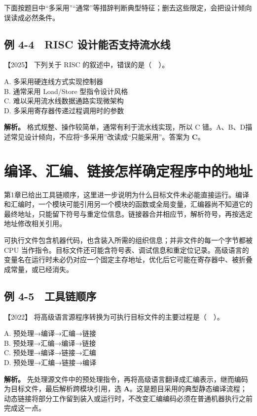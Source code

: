 下面按题目中``多采用''``通常''等措辞判断典型特征；删去这些限定，会把设计倾向误读成必然条件。

\subsection{例 4-4　RISC 设计能否支持流水线}\label{co-ex4-4}

\noindent{}【2025】 下列关于 RISC 的叙述中，错误的是（　）。

A. 多采用硬连线方式实现控制器\\
B. 通常采用 Load/Store 型指令设计风格\\
C. 难以采用流水线数据通路实现微架构\\
D. 多采用寄存器传递过程调用时的参数


\textbf{解析。} 格式规整、操作较简单，通常有利于流水线实现，所以 C 错。A、B、D描述常见设计倾向，不应将``多采用''改读成``只能采用''。答案为 \textbf{C}。

\section{编译、汇编、链接怎样确定程序中的地址}\label{co-04-05}

第1章已给出工具链顺序，这里进一步说明为什么目标文件未必能直接运行。编译和汇编时，一个模块可能引用另一个模块的函数或全局变量，汇编器尚不知道它的最终地址，只能留下符号与重定位信息。链接器合并相应节，解析符号，再按选定地址修改相关引用。

可执行文件包含机器代码，也含装入所需的组织信息；并非文件的每一个字节都被 CPU 当作指令。目标文件还可能含符号表、调试信息和重定位记录。高级语言的变量名在运行时未必仍对应一个固定主存地址，优化后它可能在寄存器中、被折叠成常量，或已经消失。

\subsection{例 4-5　工具链顺序}\label{co-ex4-5}

\noindent{}【2022】 将高级语言源程序转换为可执行目标文件的主要过程是（　）。

A. 预处理→编译→汇编→链接\\
B. 预处理→汇编→编译→链接\\
C. 预处理→编译→链接→汇编\\
D. 预处理→汇编→链接→编译


\textbf{解析。} 先处理源文件中的预处理指令，再将高级语言翻译成汇编表示，继而编码为目标文件，最后解析跨模块引用，选 \textbf{A}。这是题目采用的典型静态编译流程；动态链接将部分工作留到装入或运行时，不改变汇编编码必须在普通机器执行之前完成这一点。

